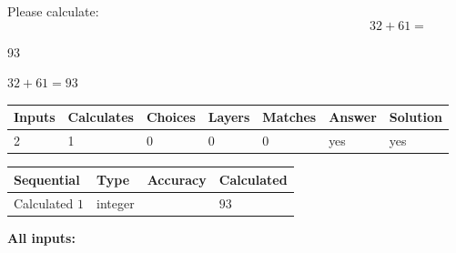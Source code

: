 \documentclass[12pt]{article}
\begin{document}
Please calculate:
\begin{equation}
32 +  %
61 = \nonumber
\end{equation}
 
 
 
\noindent{}
 
 

93
 
 
\noindent{}
 
 

 
 
 
\noindent{}
 
 

$ %
32 +  %
61=   %
93$
 
 
\noindent{}
 
 

 
   
   
   
   
\noindent\begin{tabular}{|l|l|l|l|l|l|l|}
 \hline
Inputs & Calculates & Choices & Layers & Matches & Answer & Solution \\ \hline
 2  & 
 1  & 
 0
  & 
 0  & 
 0  & 
  yes & 
  yes 
  \\ \hline
 \end{tabular}
   
   
   
   
\noindent{}
   
   
  
  
\noindent\begin{tabular}{|l|l|l|l|}
\hline
 Sequential & Type & Accuracy & Calculated \\ 
\hline
 
 
  Calculated $  1 $ & integer &  & 
  $ 93 $ 
 \\  \hline  
 \end{tabular}
   
   
   
   
\noindent\vspace{0.1in}\hspace{-0.08in} {\textbf{\Large{All inputs: }}}
   
   
  
\end{document}
